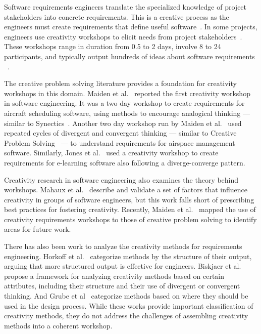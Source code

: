 Software requirements engineers translate the specialized knowledge of project stakeholders into concrete requirements. This is a creative process as the engineers must create requirements that define useful software~\cite{Robertson2002}. In some projects, engineers use creativity workshops to elicit needs from project stakeholders~\cite{Jones2005}. These workshops range in duration from 0.5 to 2 days, involve 8 to 24 participants, and typically output hundreds of ideas about software requirements ~\cite{Jones2007}.

The creative problem solving literature provides a foundation for creativity workshops in this domain.  Maiden et al.~\cite{Maiden2004} reported the first creativity workshop in software engineering. It was a two day workshop to create requirements for aircraft scheduling software, using methods to encourage analogical thinking --- similar to Synectics~\cite{Gordon1961}. Another two day workshop run by Maiden et al.~\cite{Maiden2007} used repeated cycles of divergent and convergent thinking --- similar to Creative Problem Solving~\cite{Osborn1953} --- to understand requirements for airspace management software. Similarly, Jones et al.~\cite{Jones2007} used a creativity workshop to create requirements for e-learning software also following a diverge-converge pattern.

Creativity research in software engineering also examines the theory behind workshops. Mahaux et al.~\cite{Mahaux2013,Mahaux2014} describe and validate a set of factors that influence creativity in groups of software engineers, but this work falls short of prescribing best practices for fostering creativity. Recently, Maiden et al.~\cite{Maiden2010} mapped the use of creativity requirements workshops to those of creative problem solving to identify areas for future work. 

There has also been work to analyze the creativity methods for requirements engineering. Horkoff et al.~\cite{Horkoff2015} categorize methods by the structure of their output, arguing that more structured output is effective for engineers. Biskjaer et al.~\cite{Biskjaer2017} propose a framework for analyzing creativity methods based on certain attributes, including their structure and their use of divergent or convergent thinking. And Grube et al~\cite{Grube2008} categorize methods based on where they should be used in the design process. While these works provide important classification of creativity methods, they do not address the challenges of assembling creativity methods into a coherent workshop. 

